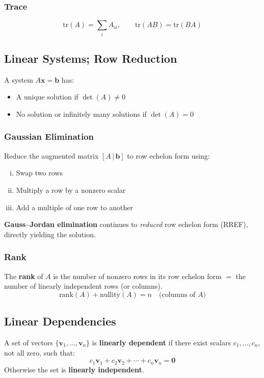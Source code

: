 \documentclass[11pt, letterpaper]{article}
\theoremstyle{plain}
\newcommand{\vv}[1]{\bm{#1}}
\begin{document}
\subsubsection*{Trace}
\[
    \text{tr}(A) = \sum_i A_{ii}, \qquad
    \text{tr}(AB) = \text{tr}(BA)
\]


\subsection{Linear Systems; Row Reduction}

A system $A\vv{x} = \vv{b}$ has:
\begin{itemize}
    \item A unique solution if $\det(A) \neq 0$
    \item No solution or infinitely many solutions if $\det(A) = 0$
\end{itemize}

\subsubsection*{Gaussian Elimination}
Reduce the augmented matrix $[A\,|\,\vv{b}]$ to row echelon form using:
\begin{enumerate}[(i)]
    \item Swap two rows
    \item Multiply a row by a nonzero scalar
    \item Add a multiple of one row to another
\end{enumerate}
\textbf{Gauss--Jordan elimination} continues to \emph{reduced} row echelon
form (RREF), directly yielding the solution.

\subsubsection*{Rank}
The \textbf{rank} of $A$ is the number of nonzero rows in its row echelon
form $=$ the number of linearly independent rows (or columns).
\[
    \text{rank}(A) + \text{nullity}(A) = n \quad \text{(columns of }A\text{)}
\]


\subsection{Linear Dependencies}

A set of vectors $\{\vv{v}_1, \ldots, \vv{v}_n\}$ is \textbf{linearly dependent}
if there exist scalars $c_1,\ldots,c_n$, not all zero, such that:
\[
    c_1\vv{v}_1 + c_2\vv{v}_2 + \cdots + c_n\vv{v}_n = \vv{0}
\]
Otherwise the set is \textbf{linearly independent}.
\end{document}
